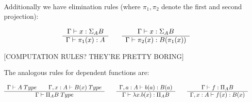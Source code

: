Additionally we have elimination rules (where $\pi_1, \pi_2$ denote the first
and second projection):

\begin{equation*}
  \begin{array}[t]{c}
    \Gamma \vdash x : \Sigma_A B\\
    \hline
    \Gamma \vdash \pi_1(x) : A\\
  \end{array}
  \qquad
  \begin{array}[t]{c}
    \Gamma \vdash x : \Sigma_A B\\
    \hline
    \Gamma \vdash \pi_2(x) : B(\pi_1(x))
  \end{array}
\end{equation*}

[COMPUTATION RULES? THEY'RE PRETTY BORING]

The analogous rules for dependent functions are:

\begin{equation*}
  \begin{array}[t]{c}
    \Gamma \vdash A \; Type \qquad \Gamma, x:A \vdash B(x) \; Type\\
    \hline
    \Gamma \vdash \Pi_A B \; Type\\
  \end{array}
  \qquad
  \begin{array}[t]{c}
    \Gamma, a:A \vdash b(a) : B(a)\\
    \hline
    \Gamma \vdash \lambda x.b(x) : \Pi_A B
  \end{array}
  \qquad
  \begin{array}[t]{c}
    \Gamma \vdash f : \Pi_A B \\
    \hline
    \Gamma, x:A \vdash f(x) : B(x)
  \end{array}
\end{equation*}